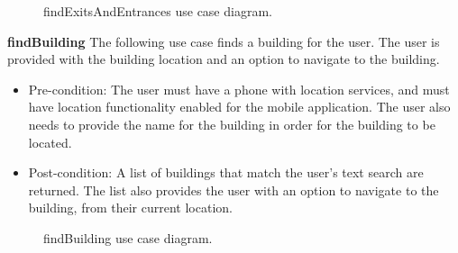 \documentclass[12pt,a4paper]{article}
\begin{document}

			\begin{figure}[ht!]
				\caption \newline findExitsAndEntrances use case diagram.
			\end{figure}

			\textbf{findBuilding}
			The following use case finds a building for the user. The user is provided with the building location and an 					option to navigate to the building.

			\begin{itemize}
			\item Pre-condition: The user must have a phone with location services, and must have location functionality 						  enabled for the mobile application. The user also needs to provide the name for the building in order for 					  the building to be located.
			\item Post-condition: A list of buildings that match the user's text search are returned. The list also provides   				  the user with an option to navigate to the building, from their current location.
			\end{itemize}

			\begin{figure}[ht!]
				\caption \newline findBuilding use case diagram.
			\end{figure}


\end{document}
\end{itemize}
\end{document}
